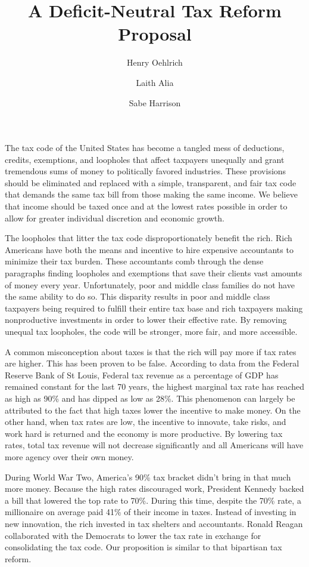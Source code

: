\documentclass[12pt]{article}
\title{A Deficit-Neutral Tax Reform Proposal}
\author{Henry Oehlrich \and Laith Alia \and Sabe Harrison}
\date{}
\begin{document}
\maketitle

The tax code of the United States has become a tangled mess of deductions,
credits, exemptions, and loopholes that affect taxpayers unequally and grant
tremendous sums of money to politically favored industries. These provisions
should be eliminated and replaced with a simple, transparent, and fair tax code
that demands the same tax bill from those making the same income. We believe
that income should be taxed once and at the lowest rates possible in order to
allow for greater individual discretion and economic growth.

The loopholes that litter the tax code disproportionately benefit the rich.
Rich Americans have both the means and incentive to hire expensive accountants
to minimize their tax burden. These accountants comb through the dense
paragraphs finding loopholes and exemptions that save their clients vast
amounts of money every year. Unfortunately, poor and middle class families do
not have the same ability to do so. This disparity results in poor and middle
class taxpayers being required to fulfill their entire tax base and rich
taxpayers making nonproductive investments in order to lower their effective
rate. By removing unequal tax loopholes, the code will be stronger, more fair,
and more accessible.

A common misconception about taxes is that the rich will pay more if tax rates
are higher. This has been proven to be false. According to data from the
Federal Reserve Bank of St Louis, Federal tax revenue as a percentage of GDP
has remained constant for the last 70 years\autocite{revenueaspercentofgdp},
the highest marginal tax rate has reached as high as 90\% and has dipped as low
as 28\%\autocite{taxbrackets}. This phenomenon can largely be attributed to the
fact that high taxes lower the incentive to make money. On the other hand, when
tax rates are low, the incentive to innovate, take risks, and work hard is
returned and the economy is more productive. By lowering tax rates, total tax
revenue will not decrease significantly and all Americans will have more agency
over their own money.

During World War Two, America's 90\% tax bracket didn't bring in that much more
money. Because the high rates discouraged work, President Kennedy backed a bill
that lowered the top rate to 70\%\autocite{revenueactof1964}. During this time,
despite the 70\% rate, a millionaire on average paid 41\% of their income in
taxes. Instead of investing in new innovation, the rich invested in tax
shelters and accountants. Ronald Reagan collaborated with the Democrats to
lower the tax rate in exchange for consolidating the tax
code.\autocite{revenueactof1986} Our proposition is similar to that bipartisan
tax reform.
\end{document}

